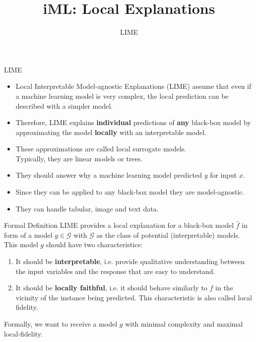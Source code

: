 \documentclass[aspectratio=169]{../latex_main/tntbeamer}  %
\title[Introduction]{iML: Local Explanations}
\subtitle{LIME}
\begin{document}
	
	\maketitle



\begin{frame}{LIME}
\begin{itemize}
		\item Local Interpretable Model-agnostic Explanations (LIME) assume that even if a machine learning model is very complex, \alert{the local prediction can be described with a simpler model}.
		\smallskip\pause
		\item  Therefore, LIME explains \textbf{individual} predictions of \textbf{any} black-box model by approximating the model \textbf{locally} with an interpretable model.
		\smallskip\pause
		\item These approximations are called local surrogate models.\\ Typically, they are linear models or trees.
		\smallskip\pause
		\item They should answer why a machine learning model predicted $y$ for input $x$.
		\smallskip\pause
		\item Since they can be applied to any black-box model they are model-agnostic.  
		\smallskip\pause
		\item They can handle tabular, image and text data. 
\end{itemize}
\end{frame}
\begin{frame}[c]{Formal Definition}
	LIME provides a local explanation for a black-box model $\hat{f}$ in form of a model $g \in \mathcal{G}$ with $\mathcal{G}$ as the class of potential (interpretable) models. This model $g$ should have two characteristics:
	\begin{enumerate}
		\item It should be \textbf{interpretable}, i.e. provide qualitative understanding between the input variables and the response that are easy to understand.  
		\item It should be \textbf{locally faithful}, i.e. it should behave similarly to $f$ in the vicinity of the instance being predicted. This characteristic is also called local fidelity. 
	\end{enumerate}
	Formally, we want to receive a model $g$ with minimal complexity and maximal local-fidelity. 
\end{frame}
\end{document}
